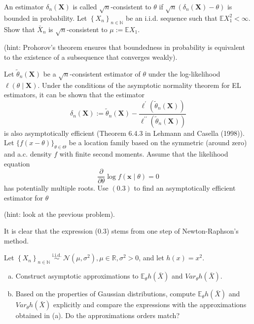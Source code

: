 \begin{ex}
    An estimator \(\delta_{n}(\mathbf{X})\) is called \(\sqrt{n}\)-consistent to \(\theta\) if \(\sqrt{n}\left(\delta_{n}(\mathbf{X})-\theta\right)\) is bounded in probability. Let \(\left\{X_{n}\right\}_{n \in \mathbb{N}}\) be an i.i.d. sequence such that \(\mathbb{E} X_{1}^{2}<\infty\). Show that \(\bar{X}_{n}\) is \(\sqrt{n}\)-consistent to \(\mu:=\mathbb{E} X_{1}\). 
    
    (hint: Prohorov's theorem ensures that boundedness in probability is equivalent to the existence of a subsequence that converges weakly). 
\end{ex}

\begin{ex}
    Let \(\tilde{\theta}_{n}(\mathbf{X})\) be a \(\sqrt{n}\)-consistent estimator of \(\theta\) under the log-likelihood \(\ell(\theta \mid \mathbf{X})\). Under the conditions of the asymptotic normality theorem for EL estimators, it can be shown that the estimator
\[
\delta_{n}(\mathbf{X}):=\tilde{\theta}_{n}(\mathbf{X})-\frac{\ell^{\prime}\left(\tilde{\theta}_{n}(\mathbf{X})\right)}{\ell^{\prime \prime}\left(\tilde{\theta}_{n}(\mathbf{X})\right)}
\]
is also asymptotically efficient (Theorem 6.4.3 in Lehmann and Casella (1998)).
Let \(\{f(x-\theta)\}_{\theta \in \Theta}\) be a location family based on the symmetric (around zero) and a.c. density \(f\) with finite second moments. Assume that the likelihood equation
\[
\frac{\partial}{\partial \theta} \log f(\mathbf{x} \mid \theta)=0
\]
has potentially multiple roots. Use \((0.3)\) to find an asymptotically efficient estimator for \(\theta\) 

(hint: look at the previous problem). 

 It is clear that the expression (0.3) stems from one step of Newton-Raphson's method.
\end{ex}


\begin{ex}
    Let \(\left\{X_{n}\right\}_{n \in \mathbb{N}} \stackrel{\text { i.i.d. }}{\sim} \mathcal{N}\left(\mu, \sigma^{2}\right), \mu \in \mathbb{R}, \sigma^{2}>0\), and let \(h(x)=x^{2}\). 
    \begin{enumerate}[(a)]
        \item Construct asymptotic approximations to \(\mathbb{E}_{\theta} h(\bar{X})\) and \(Var_{\theta} h(\bar{X})\). 
        \item Based on the properties of Gaussian distributions, compute \(\mathbb{E}_{\theta} h(\bar{X})\) and \(Var_{\theta} h(\bar{X})\) explicitly and compare the expressions with the approximations obtained in (a). Do the approximations orders match? 
    \end{enumerate}
\end{ex}

